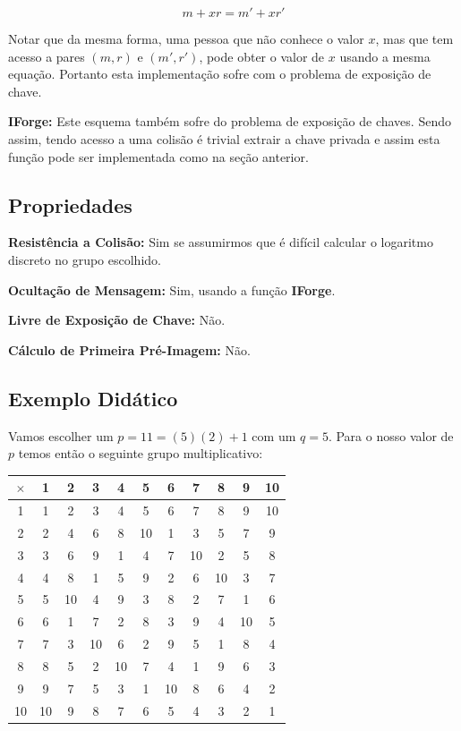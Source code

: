 \documentclass[a4paper]{article}
\begin{document}
$$
m+xr = m'+xr'
$$

Notar que da mesma forma, uma pessoa que não conhece o valor $x$, mas
que tem acesso a pares $(m, r)$ e $(m', r')$, pode obter o valor de
$x$ usando a mesma equação. Portanto esta implementação sofre com o
problema de exposição de chave.

\textbf{IForge:} Este esquema também sofre do problema de exposição de
chaves. Sendo assim, tendo acesso a uma colisão é trivial extrair a
chave privada e assim esta função pode ser implementada como na seção
anterior.

\subsection{Propriedades}

\textbf{Resistência a Colisão: }Sim se assumirmos que é difícil
calcular o logaritmo discreto no grupo escolhido.

\textbf{Ocultação de Mensagem: }Sim, usando a função \textbf{IForge}.

\textbf{Livre de Exposição de Chave: } Não.
  
\textbf{Cálculo de Primeira Pré-Imagem: }Não.

\subsection{Exemplo Didático}

Vamos escolher um $p=11=(5)(2)+1$ com um $q=5$. Para o nosso valor de
$p$ temos então o seguinte grupo multiplicativo:

\begin{tabular}{|c||c|c|c|c|c|c|c|c|c|c|}
  \hline
$\times$&1&2&3&4&5&6&7&8&9&10\\
  \hline
  \hline
1&1&2&3&4&5&6&7&8&9&10\\
\hline
2&2&4&6&8&10&1&3&5&7&9\\
\hline
3&3&6&9&1&4&7&10&2&5&8\\
\hline
4&4&8&1&5&9&2&6&10&3&7\\
\hline
5&5&10&4&9&3&8&2&7&1&6\\
\hline
6&6&1&7&2&8&3&9&4&10&5\\
\hline
7&7&3&10&6&2&9&5&1&8&4\\
\hline
8&8&5&2&10&7&4&1&9&6&3\\
\hline
9&9&7&5&3&1&10&8&6&4&2\\
\hline
10&10&9&8&7&6&5&4&3&2&1\\
\hline
\end{tabular}
\end{document}
